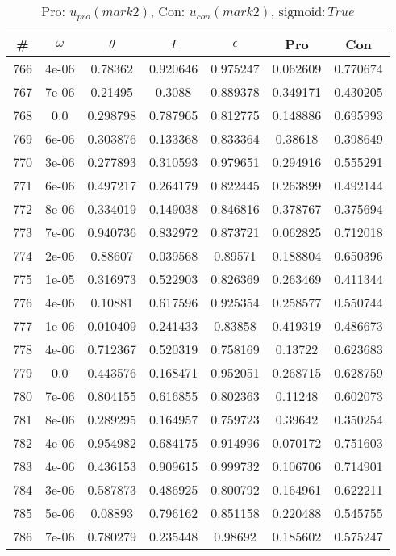 \newpage
\begin{table}
\caption{Pro: $u_{pro} (mark 2)$, Con: $u_{con} (mark 2)$, $\mathrm{sigmoid}: True$}
\begin{tabular*}{\linewidth}{c|c|c|c|c|c|c}
\# & $\omega$ & $\theta$ & $I$ & $\epsilon$ & Pro & Con \\
\hline
766 & 4e-06 & 0.78362 & 0.920646 & 0.975247 & 0.062609 & 0.770674\\
767 & 7e-06 & 0.21495 & 0.3088 & 0.889378 & 0.349171 & 0.430205\\
768 & 0.0 & 0.298798 & 0.787965 & 0.812775 & 0.148886 & 0.695993\\
769 & 6e-06 & 0.303876 & 0.133368 & 0.833364 & 0.38618 & 0.398649\\
770 & 3e-06 & 0.277893 & 0.310593 & 0.979651 & 0.294916 & 0.555291\\
771 & 6e-06 & 0.497217 & 0.264179 & 0.822445 & 0.263899 & 0.492144\\
772 & 8e-06 & 0.334019 & 0.149038 & 0.846816 & 0.378767 & 0.375694\\
773 & 7e-06 & 0.940736 & 0.832972 & 0.873721 & 0.062825 & 0.712018\\
774 & 2e-06 & 0.88607 & 0.039568 & 0.89571 & 0.188804 & 0.650396\\
775 & 1e-05 & 0.316973 & 0.522903 & 0.826369 & 0.263469 & 0.411344\\
776 & 4e-06 & 0.10881 & 0.617596 & 0.925354 & 0.258577 & 0.550744\\
777 & 1e-06 & 0.010409 & 0.241433 & 0.83858 & 0.419319 & 0.486673\\
778 & 4e-06 & 0.712367 & 0.520319 & 0.758169 & 0.13722 & 0.623683\\
779 & 0.0 & 0.443576 & 0.168471 & 0.952051 & 0.268715 & 0.628759\\
780 & 7e-06 & 0.804155 & 0.616855 & 0.802363 & 0.11248 & 0.602073\\
781 & 8e-06 & 0.289295 & 0.164957 & 0.759723 & 0.39642 & 0.350254\\
782 & 4e-06 & 0.954982 & 0.684175 & 0.914996 & 0.070172 & 0.751603\\
783 & 4e-06 & 0.436153 & 0.909615 & 0.999732 & 0.106706 & 0.714901\\
784 & 3e-06 & 0.587873 & 0.486925 & 0.800792 & 0.164961 & 0.622211\\
785 & 5e-06 & 0.08893 & 0.796162 & 0.851158 & 0.220488 & 0.545755\\
786 & 7e-06 & 0.780279 & 0.235448 & 0.98692 & 0.185602 & 0.575247\\

\end{tabular*}
\end{table}
